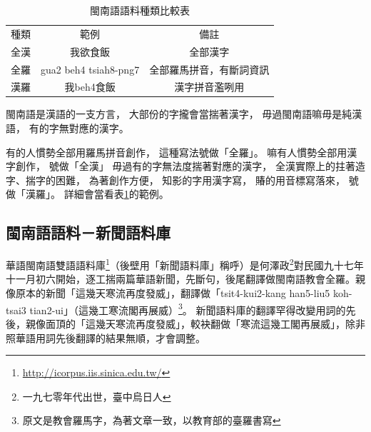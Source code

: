 \begin{table}
\caption{閩南語語料種類比較表}
\label{表：閩南語語料種類比較表}
\centering
\begin{tabular}{lcc}
種類 & 範例 & 備註\\
全漢 & 我欲食飯 & 全部漢字\\
全羅 & gua2 beh4 tsiah8-png7 & 全部羅馬拼音，有斷詞資訊\\
漢羅 &我beh4食飯 & 漢字拼音濫咧用\\
\end{tabular}
\end{table}

閩南語是漢語的一支方言，
大部份的字攏會當揣著漢字，
毋過閩南語嘛毋是純漢語，
有的字無對應的漢字。

有的人慣勢全部用羅馬拼音創作，
這種寫法號做「全羅」。
嘛有人慣勢全部用漢字創作，
號做「全漢」
毋過有的字無法度揣著對應的漢字，
全漢實際上的拄著造字、揣字的困難，
為著創作方便，
知影的字用漢字寫，
賰的用音標寫落來，
號做「漢羅」。
詳細會當看表\ref{表：閩南語語料種類比較表}的範例。

\subsection{閩南語語料－新聞語料庫}
\label{節：新聞語料庫}
華語閩南語雙語語料庫\footnote{\url{http://icorpus.iis.sinica.edu.tw/}}（後壁用「新聞語料庫」稱呼）是何澤政\footnote{一九七零年代出世，臺中烏日人}對民國九十七年十一月初六開始，逐工揣兩篇華語新聞，先斷句，後尾翻譯做閩南語教會全羅。親像原本的新聞「這幾天寒流再度發威」，翻譯做「tsit4-kui2-kang han5-liu5 koh-tsai3 tian2-ui」（這幾工寒流閣再展威）\footnote{原文是教會羅馬字，為著文章一致，以教育部的臺羅書寫}。
新聞語料庫的翻譯罕得改變用詞的先後，親像面頂的「這幾天寒流再度發威」，較袂翻做「寒流這幾工閣再展威」，除非照華語用詞先後翻譯的結果無順，才會調整。

